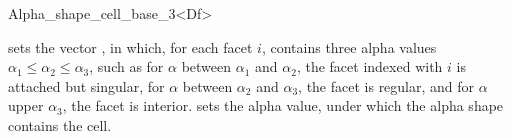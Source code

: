 \begin{ccRefClass}{Alpha_shape_cell_base_3<Df>}
\ccModifiers

\begin{ccAdvanced}

{sets the vector , in which, for each facet $i$,  contains three
alpha values
 $\alpha_1 \leq \alpha_2 \leq \alpha_3$, such as for
$\alpha$  between $\alpha_1$ and $\alpha_2$, the facet indexed with $i$ is
attached but singular, 
for $\alpha$ between $\alpha_2$ and $\alpha_3$, the facet is regular, and for $\alpha$
upper $\alpha_3$, the facet is interior.}
{sets the alpha value, under which the alpha shape contains the
cell.}

\end{ccAdvanced}

\end{ccRefClass}
